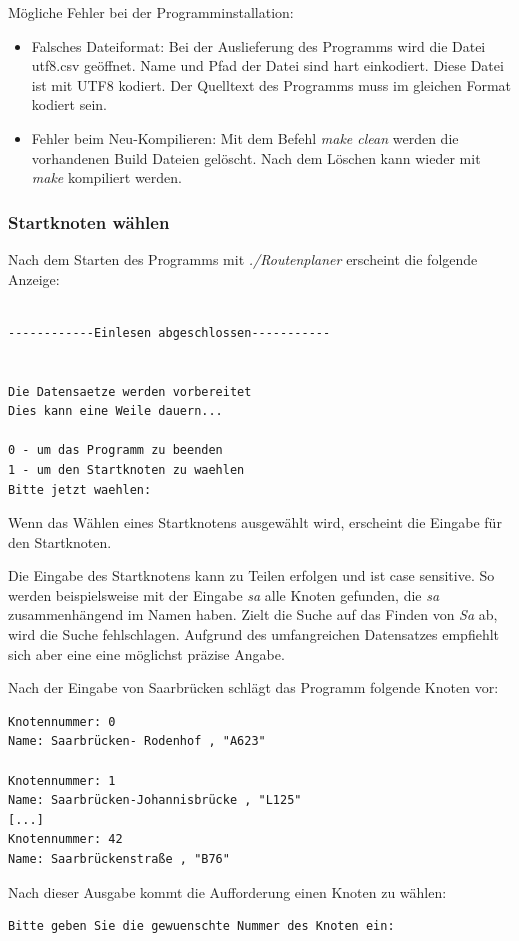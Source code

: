 \documentclass[12pt, a4paper, ngerman]{article}
\newcommand{\todo}[1]{\fcolorbox{red}{yellow}{ \parbox{0.75\linewidth}{#1}}} %
\begin{document}
\smallskip
Mögliche Fehler bei der Programminstallation:
\begin{itemize}
	\item Falsches Dateiformat: Bei der Auslieferung des Programms wird die Datei utf8.csv geöffnet. Name und Pfad der Datei sind hart einkodiert. Diese Datei ist mit UTF8 kodiert. Der Quelltext des Programms muss im gleichen Format kodiert sein. \todo{Stimmt das denn auch?}
	\item Fehler beim Neu-Kompilieren: Mit dem Befehl \textit{make clean}  werden die vorhandenen Build Dateien gelöscht. Nach dem Löschen kann wieder mit \textit{make} kompiliert werden.
\end{itemize}

\subsubsection{Startknoten wählen}
Nach dem Starten des Programms mit \textit{./Routenplaner} erscheint die folgende Anzeige:

\begin{lstlisting}

------------Einlesen abgeschlossen-----------


Die Datensaetze werden vorbereitet
Dies kann eine Weile dauern...

0 - um das Programm zu beenden
1 - um den Startknoten zu waehlen
Bitte jetzt waehlen:  
\end{lstlisting}

Wenn das Wählen eines Startknotens ausgewählt wird, erscheint die Eingabe für den Startknoten.

Die Eingabe des Startknotens kann zu Teilen erfolgen und ist case sensitive. So werden beispielsweise mit der Eingabe \textit{sa} alle Knoten gefunden, die \textit{sa} zusammenhängend im Namen haben. Zielt die Suche auf das Finden von \textit{Sa} ab, wird die Suche fehlschlagen. Aufgrund des umfangreichen Datensatzes empfiehlt sich aber eine eine möglichst präzise Angabe. 

Nach der Eingabe von Saarbrücken schlägt das Programm folgende Knoten vor:
\begin{lstlisting}
Knotennummer: 0
Name: Saarbrücken- Rodenhof , "A623"

Knotennummer: 1
Name: Saarbrücken-Johannisbrücke , "L125"
[...]
Knotennummer: 42
Name: Saarbrückenstraße , "B76"
\end{lstlisting} 
Nach dieser Ausgabe kommt die Aufforderung einen Knoten zu wählen:
\begin{lstlisting}
Bitte geben Sie die gewuenschte Nummer des Knoten ein:
\end{lstlisting}
\end{document}
